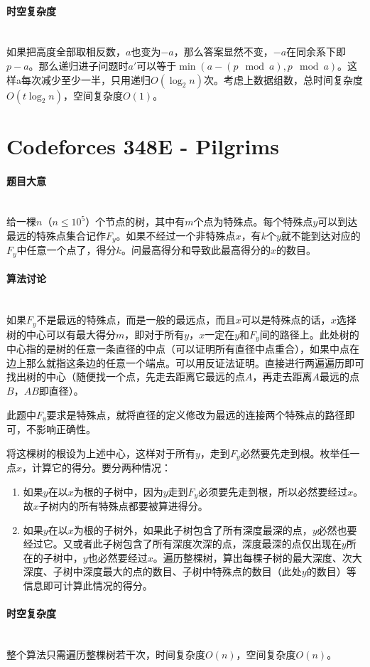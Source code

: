 \documentclass[UTF8]{ctexart}
\newcommand{\myparagraph}[1]{\paragraph{#1}\mbox{}\\}
\theoremstyle{nonumberplain}
\begin{document}
		\myparagraph{时空复杂度}
		
			如果把高度全部取相反数，$a$也变为$-a$，那么答案显然不变，$-a$在同余系下即$p-a$。那么递归进子问题时$a'$可以等于$\min(a-(p \mod a), p \mod a)$。这样a每次减少至少一半，只用递归$O(\log_2n)$次。考虑上数据组数，总时间复杂度$O(t\log_2n)$，空间复杂度$O(1)$。
	
	\section{Codeforces 348E - Pilgrims}
	
		\myparagraph{题目大意}
		
			给一棵$n$（$n \leq 10^5$）个节点的树，其中有$m$个点为特殊点。每个特殊点$y$可以到达最远的特殊点集合记作$F_y$。如果不经过一个非特殊点$x$，有$k$个$y$就不能到达对应的$F_y$中任意一个点了，得分$k$。问最高得分和导致此最高得分的$x$的数目。
		
		\myparagraph{算法讨论}
		
			如果$F_y$不是最远的特殊点，而是一般的最远点，而且$x$可以是特殊点的话，$x$选择树的中心可以有最大得分$m$，即对于所有$y$，$x$一定在$y$和$F_y$间的路径上。此处树的中心指的是树的任意一条直径的中点（可以证明所有直径中点重合），如果中点在边上那么就指这条边的任意一个端点。可以用反证法证明。直接进行两遍遍历即可找出树的中心（随便找一个点，先走去距离它最远的点$A$，再走去距离$A$最远的点$B$，$AB$即直径）。
			
			此题中$F_y$要求是特殊点，就将直径的定义修改为最远的连接两个特殊点的路径即可，不影响正确性。
			
			将这棵树的根设为上述中心，这样对于所有$y$，走到$F_y$必然要先走到根。枚举任一点$x$，计算它的得分。要分两种情况：
			
			\begin{enumerate}
				\item 如果$y$在以$x$为根的子树中，因为$y$走到$F_y$必须要先走到根，所以必然要经过$x$。故$x$子树内的所有特殊点都要被算进得分。
				\item 如果$y$在以$x$为根的子树外，如果此子树包含了所有深度最深的点，$y$必然也要经过它。又或者此子树包含了所有深度次深的点，深度最深的点仅出现在$y$所在的子树中，$y$也必然要经过$x$。遍历整棵树，算出每棵子树的最大深度、次大深度、子树中深度最大的点的数目、子树中特殊点的数目（此处$y$的数目）等信息即可计算此情况的得分。
			\end{enumerate}
		
		\myparagraph{时空复杂度}
		
			整个算法只需遍历整棵树若干次，时间复杂度$O(n)$，空间复杂度$O(n)$。
	
\end{document}
